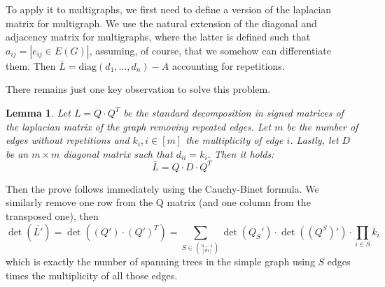 \documentclass[a4paper, 10pt]{article}
\newtheorem{lemma}{Lemma}
\theoremstyle{definition} %
\begin{document}
To apply it to multigraphs, we first need to define a version of the laplacian matrix for multigraph.
We use the natural extension of the diagonal and adjacency matrix for multigraphs, where the latter is defined such that $a_{ij} = \left| e_{ij} \in E(G) \right|$, assuming, of course, that we somehow can differentiate them.
Then $\bar{L} = \text{diag}(d_1, \dots, d_n) - A$ accounting for repetitions.

There remains just one key observation to solve this problem.
\begin{lemma}
    Let $L = Q \cdot Q^T$ be the standard decomposition in signed matrices of the laplacian matrix of the graph \emph{removing} repeated edges.
    Let $m$ be the number of edges without repetitions and $k_i, i \in [m]$ the multiplicity of edge $i$.
    Lastly, let $D$ be an $m \times m$ diagonal matrix such that $d_{ii} = k_i$. Then it holds:
    $$\bar{L} = Q \cdot D \cdot Q ^T$$
\end{lemma}

Then the prove follows immediately using the Cauchy-Binet formula.
We similarly remove one row from the Q matrix (and one column from the transposed one), then
$$\det(\bar{L'}) = \det\left((Q')\cdot(Q')^T\right) = \sum_{S \in {n-1 \choose [m]}} \det\left(Q_S'\right) \cdot \det((Q^{S})') \cdot \prod_{i \in S} k_i$$
which is exactly the number of spanning trees in the simple graph using $S$ edges times the multiplicity of all those edges.
\end{document}
